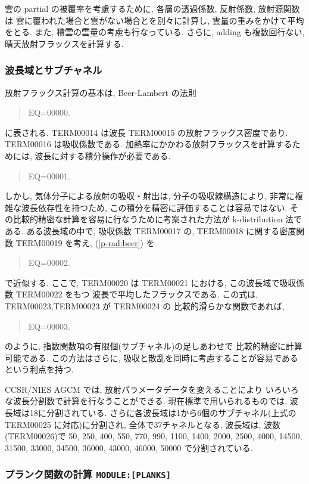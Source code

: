 雲の partial の被覆率を考慮するために,
各層の透過係数, 反射係数, 放射源関数は
雲に覆われた場合と雲がない場合とを別々に計算し,
雲量の重みをかけて平均をとる.
また, 積雲の雲量の考慮も行なっている.
さらに, adding も複数回行ない, 晴天放射フラックスを計算する.

\subsubsection{波長域とサブチャネル}

放射フラックス計算の基本は,
Beer-Lambert の法則
\begin{quote}
EQ=00000.
\end{quote}
に表される. TERM00014 は波長 TERM00015 の放射フラックス密度であり.
TERM00016 は吸収係数である.
加熱率にかかわる放射フラックスを計算するためには,
波長に対する積分操作が必要である.
%
\begin{quote}
EQ=00001.
\label{p-rad:beer}
\end{quote}
%
しかし, 気体分子による放射の吸収・射出は,
分子の吸収線構造により, 非常に複雑な波長依存性を持つため,
この積分を精密に評価することは容易ではない.
その比較的精密な計算を容易に行なうために考案された方法が
k-distribution 法である.
ある波長域の中で, 吸収係数 TERM00017 の,
TERM00018 に関する密度関数 TERM00019 を考え,
(\ref{p-rad:beer}) を
\begin{quote}
EQ=00002.
\end{quote}
で近似する. ここで, TERM00020 は
TERM00021 における, この波長域で吸収係数 TERM00022 をもつ
波長で平均したフラックスである.
この式は, TERM00023,TERM00023 が TERM00024 の
比較的滑らかな関数であれば, 
\begin{quote}
EQ=00003.
\label{p-rad:beer-kd}
\end{quote}
のように, 指数関数項の有限個(サブチャネル)の足しあわせで
比較的精密に計算可能である.
この方法はさらに,
吸収と散乱を同時に考慮することが容易であるという利点を持つ.

CCSR/NIES AGCM では,
放射パラメータデータを変えることにより
いろいろな波長分割数で計算を行なうことができる.
現在標準で用いられるものでは,
波長域は18に分割されている.
さらに各波長域は1から6個のサブチャネル(上式の TERM00025 に対応)に分割され,
全体で37チャネルとなる.
波長域は, 波数(TERM00026)で
50, 250, 400, 550, 770, 990, 1100, 1400, 2000,
2500, 4000, 14500, 31500, 33000, 34500, 36000, 43000, 46000, 50000
で分割されている.

\subsubsection{プランク関数の計算 \texttt{MODULE:[PLANKS]}}

